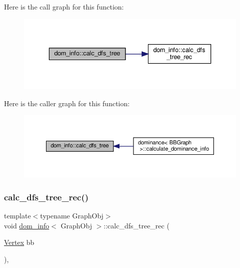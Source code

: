 Here is the call graph for this function\+:
\nopagebreak
\begin{figure}[H]
\begin{center}
\leavevmode
\includegraphics[width=336pt]{d3/dea/classdom__info_aacc461d94e7bf7cc2e3b3994a42958ae_cgraph}
\end{center}
\end{figure}
Here is the caller graph for this function\+:
\nopagebreak
\begin{figure}[H]
\begin{center}
\leavevmode
\includegraphics[width=350pt]{d3/dea/classdom__info_aacc461d94e7bf7cc2e3b3994a42958ae_icgraph}
\end{center}
\end{figure}
\mbox{\label{classdom__info_a18d67c729387f2e0c4f352a4f754e9a7}} 
\subsubsection{\texorpdfstring{calc\+\_\+dfs\+\_\+tree\+\_\+rec()}{calc\_dfs\_tree\_rec()}}
{\footnotesize\ttfamily template$<$typename Graph\+Obj$>$ \\
void \hyperlink{classdom__info}{dom\+\_\+info}$<$ Graph\+Obj $>$\+::calc\+\_\+dfs\+\_\+tree\+\_\+rec (\begin{DoxyParamCaption}\item[{\hyperlink{classdom__info_a5e4ca21e2c5281bdbb95d2c8d965c9be}{Vertex}}]{bb }\end{DoxyParamCaption})\hspace{0.3cm}{\ttfamily [inline]}, {\ttfamily [private]}}



